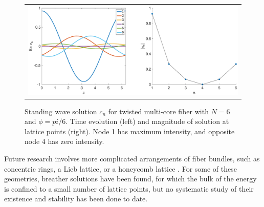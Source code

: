 \documentclass[12pt,reqno,oneside]{article}
\theoremstyle{definition}
\theoremstyle{remark}
\begin{document}
\begin{figure}[H]
\begin{center}
\begin{tabular}{c}
\includegraphics[width=14cm]{images/evenhole6}
\end{tabular}
\end{center}
\caption{Standing wave solution $c_n$ for twisted multi-core fiber with $N = 6$ and $\phi = pi/6$. Time evolution (left) and magnitude of solution at lattice points (right). Node 1 has maximum intensity, and opposite node 4 has zero intensity.}
\label{fig:twistcn}
\end{figure}
Future research involves more complicated arrangements of fiber bundles, such as concentric rings, a Lieb lattice, or a honeycomb lattice \cite{Lumer2013,Marzuola2019}. For some of these geometries, breather solutions have been found, for which the bulk of the energy is confined to a small number of lattice points, but no systematic study of their existence and stability has been done to date.


\footnotesize{  }
\end{document}
